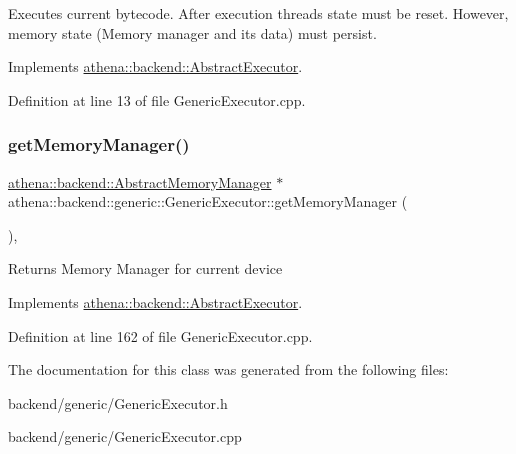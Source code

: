 Executes current bytecode. After execution threads state must be reset. However, memory state (Memory manager and its data) must persist. 

Implements \mbox{\hyperlink{classathena_1_1backend_1_1_abstract_executor_a5f179146ae76002b678a4862553f87ce}{athena\+::backend\+::\+Abstract\+Executor}}.



Definition at line 13 of file Generic\+Executor.\+cpp.

\mbox{\label{classathena_1_1backend_1_1generic_1_1_generic_executor_a0560a1dfc0c70ebef0b5be26bb82b9c5}} 
\subsubsection{\texorpdfstring{get\+Memory\+Manager()}{getMemoryManager()}}
{\footnotesize\ttfamily \mbox{\hyperlink{classathena_1_1backend_1_1_abstract_memory_manager}{athena\+::backend\+::\+Abstract\+Memory\+Manager}} $\ast$ athena\+::backend\+::generic\+::\+Generic\+Executor\+::get\+Memory\+Manager (\begin{DoxyParamCaption}{ }\end{DoxyParamCaption})\hspace{0.3cm}{\ttfamily [override]}, {\ttfamily [virtual]}}

\begin{DoxyReturn}{Returns}
Memory Manager for current device 
\end{DoxyReturn}


Implements \mbox{\hyperlink{classathena_1_1backend_1_1_abstract_executor_a6d61486e2a06500c9c0aa1e03a475e4a}{athena\+::backend\+::\+Abstract\+Executor}}.



Definition at line 162 of file Generic\+Executor.\+cpp.



The documentation for this class was generated from the following files\+:\begin{DoxyCompactItemize}
\item 
backend/generic/Generic\+Executor.\+h\item 
backend/generic/Generic\+Executor.\+cpp\end{DoxyCompactItemize}
